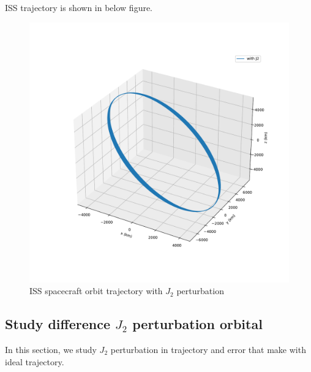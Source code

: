 ISS trajectory is shown in below figure.
\begin{figure}[H]
    \centering
    \includegraphics[width=1\textwidth]{../Figure/Q3/ISS_trajectory_J2}
    \caption{ISS spacecraft orbit trajectory with $J_2$ perturbation}
\end{figure}

\subsection{Study difference $J_2$ perturbation orbital}
In this section, we study $J_2$ perturbation in trajectory and error that make with ideal trajectory.

